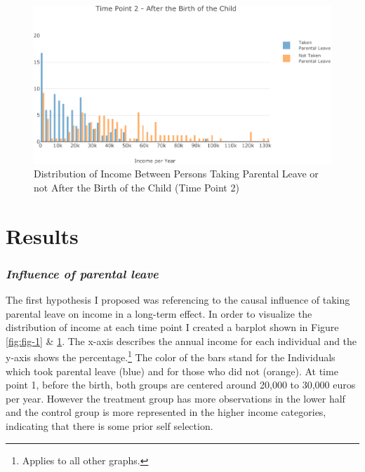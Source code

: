\documentclass[
  11pt,
]{article}
\begin{document}
\begin{figure}

{\centering \includegraphics{Parental_Leave-GESS-VersionRmd_files/figure-latex/fig-2-1} 

}

\caption{Distribution of Income Between Persons Taking Parental Leave or not After the Birth of the Child (Time Point 2)}\label{fig:fig-2}
\end{figure}

\hypertarget{results}{%
\section{Results}\label{results}}

\hypertarget{influence-of-parental-leave}{%
\subsubsection*{\texorpdfstring{\emph{Influence of parental leave}}{Influence of parental leave}}\label{influence-of-parental-leave}}

The first hypothesis I proposed was referencing to the causal influence of taking parental leave on income in a long-term effect. In order to visualize the distribution of income at each time point I created a barplot shown in Figure \ref{fig:fig-1} \& \ref{fig:fig-2}. The x-axis describes the annual income for each individual and the y-axis shows the percentage.\footnote{Applies to all other graphs.} The color of the bars stand for the Individuals which took parental leave (blue) and for those who did not (orange). At time point 1, before the birth, both groups are centered around 20,000 to 30,000 euros per year. However the treatment group has more observations in the lower half and the control group is more represented in the higher income categories, indicating that there is some prior self selection.
\end{document}

